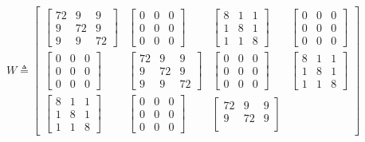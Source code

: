\begin{equation}
W\triangleq
\begin{bmatrix}
\begin{bmatrix}
72 & 9 & 9\\
9 & 72 & 9\\
9 & 9 & 72
\end{bmatrix}
&
\begin{bmatrix}
0 & 0 & 0\\
0 & 0 & 0\\
0 & 0 & 0
\end{bmatrix}
&
\begin{bmatrix}
8 & 1 & 1\\
1 & 8 & 1\\
1 & 1 & 8
\end{bmatrix}
&
\begin{bmatrix}
0 & 0 & 0\\
0 & 0 & 0\\
0 & 0 & 0
\end{bmatrix}
\\
\begin{bmatrix}
0 & 0 & 0\\
0 & 0 & 0\\
0 & 0 & 0
\end{bmatrix}
&
\begin{bmatrix}
72 & 9 & 9\\
9 & 72 & 9\\
9 & 9 & 72
\end{bmatrix}
&
\begin{bmatrix}
0 & 0 & 0\\
0 & 0 & 0\\
0 & 0 & 0
\end{bmatrix}
&
\begin{bmatrix}
8 & 1 & 1\\
1 & 8 & 1\\
1 & 1 & 8
\end{bmatrix}
\\
\begin{bmatrix}
8 & 1 & 1\\
1 & 8 & 1\\
1 & 1 & 8
\end{bmatrix}
&
\begin{bmatrix}
0 & 0 & 0\\
0 & 0 & 0\\
0 & 0 & 0
\end{bmatrix}
&
\begin{bmatrix}
72 & 9 & 9\\
9 & 72 & 9\\

\end{bmatrix}
\end{bmatrix}
\end{equation}
